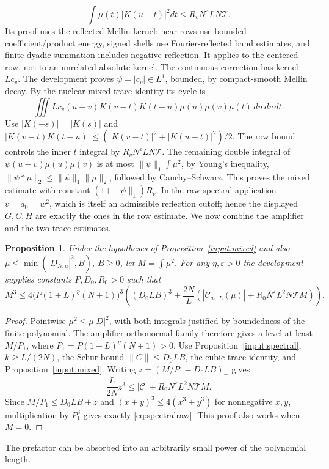 \documentclass[11pt,a4paper,oneside]{article}
\newtheorem{proposition}[theorem]{Proposition}
\theoremstyle{definition}
\newcommand{\eps}{\varepsilon}
\numberwithin{equation}{section}
\begin{document}
\[
 \int\mu(t)|K(u-t)|^2dt\le R_vN^\eps LN\mathcal T.
\]
Its proof uses the reflected Mellin kernel: near rows use bounded
coefficient/product energy, signed shells use Fourier-reflected band estimates,
and finite dyadic summation includes negative reflection. It applies to the
centered row, not to an unrelated absolute kernel.
The continuous correction has kernel $Lc_v$. The development proves
$\psi=|c_v|\in L^1$, bounded, by compact-smooth Mellin decay.
By the nuclear mixed trace identity its cycle is
\[
 \iiint Lc_v(u-v)K(v-t)K(t-u)\mu(u)\mu(v)\mu(t)\,du\,dv\,dt.
\]
Use $|K(-s)|=|K(s)|$ and
$|K(v-t)K(t-u)|\le(|K(v-t)|^2+|K(u-t)|^2)/2$.
The row bound controls the inner $t$ integral by $R_vN^\eps LN\mathcal T$.
The remaining double integral of $\psi(u-v)\mu(u)\mu(v)$ is at most
$\|\psi\|_1\int\mu^2$, by Young's inequality, $\|\psi*\mu\|_2\le\|\psi\|_1\|\mu\|_2$, followed by Cauchy--Schwarz.
This proves the mixed estimate with constant
$(1+\|\psi\|_1)R_v$. In the raw spectral application $v=a_0=w^2$,
which is itself an admissible reflection cutoff; hence the displayed
$G,C,H$ are exactly the ones in the row estimate.
We now combine the amplifier and the two trace estimates.
\begin{proposition}\label{prop:spectralraw}
Under the hypotheses of Proposition~\ref{input:mixed} and also
$\mu\le\min(|D_{N,a}|^2,B)$, $B\ge0$, let $M=\int\mu^2$.
For any $\eta,\eps>0$ the development supplies constants $P,D_0,R_0>0$ such that
\begin{equation}\label{eq:spectralraw}
 M^3\le4\bigl(P(1+L)^\eta(N+1)\bigr)^3
 \left((D_0LB)^3+\frac{2N}{L}
   \left(|\mathcal C_{a_0,L}(\mu)|+R_0N^\eps L^2N\mathcal T M\right)\right).
\end{equation}
\end{proposition}
\begin{proof}
Pointwise $\mu^2\le\mu|D|^2$, with both integrals justified by boundedness
of the finite polynomial. The amplifier orthonormal family therefore gives a level at
least $M/P_1$, where $P_1=P(1+L)^\eta(N+1)>0$.
Use Proposition~\ref{input:spectral}, $k\ge L/(2N)$, the Schur bound
$\|C\|\le D_0LB$, the cubic trace identity, and Proposition~\ref{input:mixed}.
Writing $z=(M/P_1-D_0LB)_+$ gives
\[
 \frac L{2N}z^3\le|\mathcal C|+R_0N^\eps L^2N\mathcal T M.
\]
Since $M/P_1\le D_0LB+z$ and
$(x+y)^3\le4(x^3+y^3)$ for nonnegative $x,y$, multiplication by $P_1^3$
gives exactly \eqref{eq:spectralraw}. This proof also works when $M=0$.
\end{proof}
The prefactor can be absorbed into an arbitrarily small power of the polynomial length.
\end{document}
